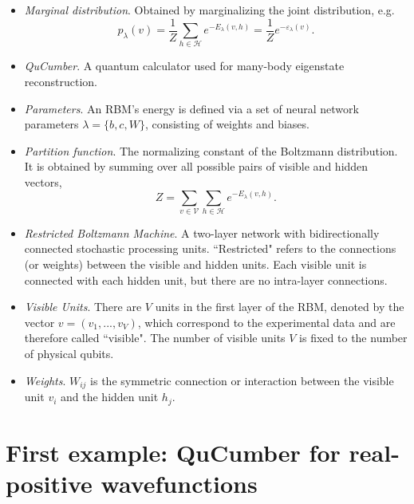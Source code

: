\documentclass[submission, Phys]{SciPost}
\begin{document}
\begin{itemize}
\item {\it Marginal distribution}.  Obtained by marginalizing the joint distribution, e.g.
\begin{equation}
\label{Eq:marginal_distribution}
    p_{\lambda}(v) = \frac{1}{Z} \sum\limits_{h\in \mathcal{H}} e^{-E_{\lambda}(v,h)} = \frac{1}{Z} e^{- \varepsilon_{\lambda}(v)}.
\end{equation}

\item {\it QuCumber}. A quantum calculator used for many-body eigenstate reconstruction.

\item {\it Parameters}.  An RBM's energy is defined via a set of neural network parameters $\lambda = \{b,c,W\}$, consisting of weights and biases.

\item {\it Partition function}. The normalizing constant of the Boltzmann distribution.  It is obtained by summing over all possible pairs of visible and hidden vectors,
\begin{equation}
    Z = \sum\limits_{v\in \mathcal{V}}\sum\limits_{h\in \mathcal{H}} e^{-E_{\lambda}(v,h)}.
\end{equation}

\item {\it Restricted Boltzmann Machine}.  A two-layer network with bidirectionally connected stochastic processing units.  ``Restricted" refers to the connections (or weights) between the visible and hidden units. Each visible unit is connected with each hidden unit, but there are no intra-layer connections.

\item {\it Visible Units}.  There are $V$ units in the first layer of the RBM, denoted by the vector $v=(v_1, ..., v_V)$, which correspond to the experimental data and are therefore called ``visible".  The number of visible units $V$ is fixed to the number of physical qubits.

\item {\it Weights}.  $W_{ij}$ is the symmetric connection or interaction between the visible unit $v_i$ and the hidden unit $h_j$.

\end{itemize}



\section{First example: QuCumber for real-positive wavefunctions}
\end{document}
